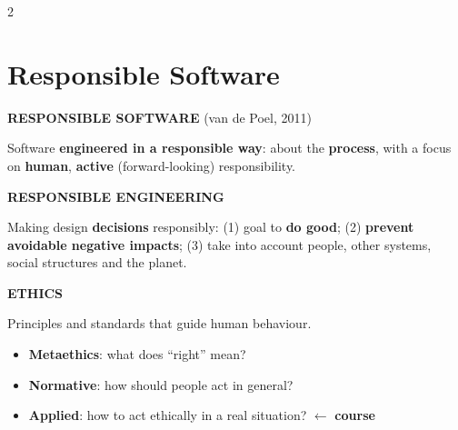 \documentclass[a4paper,9pt]{extarticle}
\begin{document}

\thispagestyle{fancy}



\begin{multicols}{2}


\section{Responsible Software}


\begin{definition}

\textbf{RESPONSIBLE SOFTWARE} (van de Poel, 2011)

Software \textbf{engineered in a responsible way}: about the \textbf{process}, with a focus on
\textbf{human}, \textbf{active} (forward-looking) responsibility.

\end{definition}


\begin{definition}

\textbf{RESPONSIBLE ENGINEERING}

Making design \textbf{decisions} responsibly: (1) goal to \textbf{do good}; (2)
\textbf{prevent avoidable negative impacts}; (3) take into account people, other systems,
social structures and the planet.

\end{definition}


\begin{definition}

\textbf{ETHICS}

Principles and standards that guide human behaviour.

\begin{itemize}

\item \textbf{Metaethics}: what does ``right'' mean?

\item \textbf{Normative}: how should people act in general?

\item \textbf{Applied}: how to act ethically in a real situation? $\leftarrow$ \textbf{course}

\end{itemize}

\end{definition}


\begin{important}


\end{important}
\end{multicols}
\end{document}
